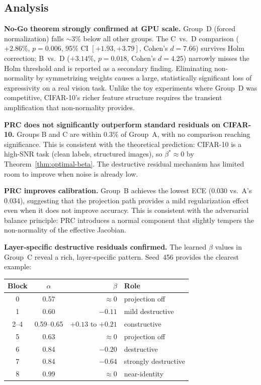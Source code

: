 \documentclass[11pt,a4paper]{article}
\theoremstyle{definition}
\begin{document}
\subsection{Analysis}

\textbf{No-Go theorem strongly confirmed at GPU scale.}
Group~D (forced normalization) falls ${\sim}3\%$ below all other groups.
The C~vs.~D comparison ($+2.86\%$, $p = 0.006$, 95\% CI $[+1.93, +3.79]$,
Cohen's $d = 7.66$) survives Holm correction; B~vs.~D ($+3.14\%$,
$p = 0.018$, Cohen's $d = 4.25$) narrowly misses the Holm threshold
and is reported as a secondary finding.
Eliminating non-normality by symmetrizing weights causes a large,
statistically significant loss of expressivity on a real vision task.
Unlike the toy experiments where Group~D was competitive, CIFAR-10's
richer feature structure requires the transient amplification that
non-normality provides.

\textbf{PRC does not significantly outperform standard residuals on CIFAR-10.}
Groups B and C are within $0.3\%$ of Group~A, with no comparison reaching
significance. This is consistent with the theoretical prediction:
CIFAR-10 is a high-SNR task (clean labels, structured images), so
$\beta^* \approx 0$ by Theorem~\ref{thm:optimal-beta}. The
destructive residual mechanism has limited room to improve when
noise is already low.

\textbf{PRC improves calibration.}
Group~B achieves the lowest ECE (0.030 vs.\ A's 0.034), suggesting
that the projection path provides a mild regularization effect even
when it does not improve accuracy. This is consistent with the
adversarial balance principle: PRC introduces a normal component
that slightly tempers the non-normality of the effective Jacobian.

\textbf{Layer-specific destructive residuals confirmed.}
The learned $\beta$ values in Group~C reveal a rich, layer-specific
pattern. Seed~456 provides the clearest example:

\begin{center}
\begin{tabular}{ccrl}
Block & $\alpha$ & $\beta$ & Role \\
\midrule
0     & 0.57 & $\approx 0$    & projection off \\
1     & 0.60 & $-0.11$ & mild destructive \\
2--4  & 0.59--0.65 & $+0.13$ to $+0.21$ & constructive \\
5     & 0.63 & $\approx 0$    & projection off \\
6     & 0.84 & $-0.20$ & destructive \\
7     & 0.84 & $\mathbf{-0.64}$ & strongly destructive \\
8     & 0.99 & $\approx 0$    & near-identity \\
\end{tabular}
\end{center}
\end{document}
